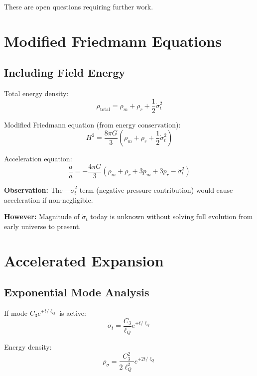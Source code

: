 \documentclass[11pt,a4paper]{article}
\theoremstyle{definition}
\theoremstyle{remark}
\begin{document}
	These are open questions requiring further work.
	
	\section{Modified Friedmann Equations}
	
	\subsection{Including Field Energy}
	
	Total energy density:
	\begin{equation}
		\rho_{\text{total}} = \rho_m + \rho_r + \frac{1}{2}\dot{\sigma}_t^2
	\end{equation}
	
	Modified Friedmann equation (from energy conservation):
	\begin{equation}
		H^2 = \frac{8\pi G}{3}\left(\rho_m + \rho_r + \frac{1}{2}\dot{\sigma}_t^2\right)
	\end{equation}
	
	Acceleration equation:
	\begin{equation}
		\frac{\ddot{a}}{a} = -\frac{4\pi G}{3}\left(\rho_m + \rho_r + 3p_m + 3p_r - \dot{\sigma}_t^2\right)
	\end{equation}
	
	\textbf{Observation:} The $-\dot{\sigma}_t^2$ term (negative pressure contribution) would cause acceleration if non-negligible.
	
	\textbf{However:} Magnitude of $\dot{\sigma}_t$ today is unknown without solving full evolution from early universe to present.
	
	\section{Accelerated Expansion}
	
	\subsection{Exponential Mode Analysis}
	
	If mode $C_3 e^{+t/\ell_Q}$ is active:
	\begin{equation}
		\dot{\sigma}_t = \frac{C_3}{\ell_Q}e^{+t/\ell_Q}
	\end{equation}
	
	Energy density:
	\begin{equation}
		\rho_\sigma = \frac{C_3^2}{2\ell_Q^2}e^{+2t/\ell_Q}
	\end{equation}
	
\end{document}
